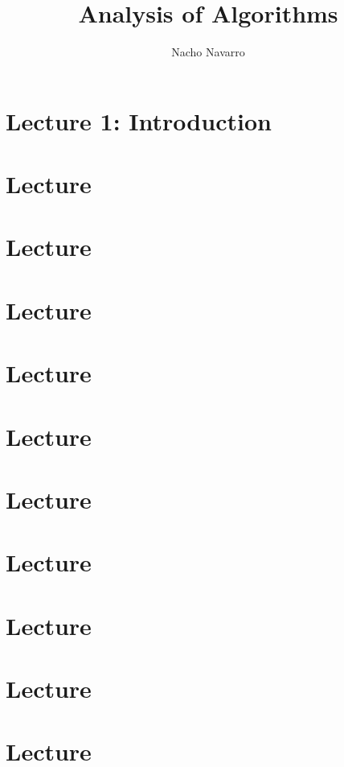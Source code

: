 \documentclass{easyclass}
\begin{document}
\begin{titlepage}
    \title{Analysis of Algorithms}
    \author{Nacho Navarro}
    \maketitle
\end{titlepage}

\tableofcontents

\chapter{Lecture 1: Introduction}


\chapter{Lecture}


\chapter{Lecture}


\chapter{Lecture}


\chapter{Lecture}


\chapter{Lecture}


\chapter{Lecture}


\chapter{Lecture}


\chapter{Lecture}


\chapter{Lecture}


\chapter{Lecture}



%
\end{document}
